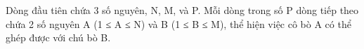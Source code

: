 Dòng đầu tiên chứa 3 số nguyên, N, M, và P. Mỗi dòng trong số P dòng tiếp theo chứa 2 số nguyên A (1 ≤ A ≤ N) và B (1 ≤ B ≤ M), thể hiện việc cô bò A có thể ghép được với chú bò B.